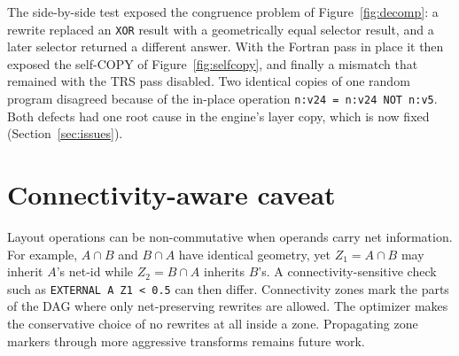 \documentclass[11pt]{article}
\newcommand{\op}[1]{\texttt{#1}}
\begin{document}
The side-by-side test exposed the congruence problem of Figure~\ref{fig:decomp}: a rewrite replaced an \op{XOR} result with a geometrically equal selector result, and a later selector returned a different answer. With the Fortran pass in place it then exposed the self-COPY of Figure~\ref{fig:selfcopy}, and finally a mismatch that remained with the TRS pass disabled. Two identical copies of one random program disagreed because of the in-place operation \texttt{n:v24 = n:v24 NOT n:v5}. Both defects had one root cause in the engine's layer copy, which is now fixed (Section~\ref{sec:issues}).

\section{Connectivity-aware caveat}\label{sec:conn}
Layout operations can be non-commutative when operands carry net information. For example, $A\cap B$ and $B\cap A$ have identical geometry, yet $Z_1=A\cap B$ may inherit $A$'s net-id while $Z_2=B\cap A$ inherits $B$'s. A connectivity-sensitive check such as \texttt{EXTERNAL A Z1 < 0.5} can then differ. Connectivity zones mark the parts of the DAG where only net-preserving rewrites are allowed. The optimizer makes the conservative choice of no rewrites at all inside a zone. Propagating zone markers through more aggressive transforms remains future work.
\end{document}
